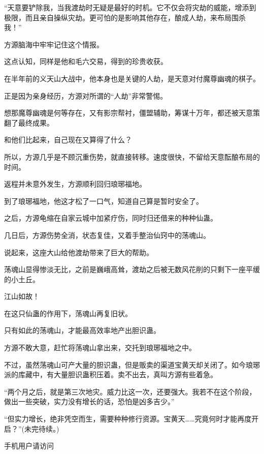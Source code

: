 \begin{this_body}
“天意要铲除我，当我渡劫时无疑是最好的时机。它不仅会将灾劫的威能，增添到极限，而且亲自操纵灾劫。更可怕的是影响其他存在，酿成人劫，来布局围杀我！”

方源脑海中牢牢记住这个情报。

这点认知，同样是他和毛六交易，得到的珍贵收获。

在半年前的义天山大战中，他本身也是关键的人劫，是天意对付魔尊幽魂的棋子。

正是因为亲身经历，方源对所谓的“人劫”非常警惕。

想那魔尊幽魂是何等存在，又有影宗帮衬，僵盟辅助，筹谋十万年，都还被天意策翻了最终成果。

和他们比起来，自己现在又算得了什么？

所以，方源几乎是不顾沉重伤势，就直接转移。速度很快，不留给天意酝酿布局的时间。

返程并未意外发生，方源顺利回归琅琊福地。

到了琅琊福地，他这才松了一口气，知道自己算是暂时安全了。

之后，方源龟缩在自家云城中加紧疗伤，同时归还借来的种种仙蛊。

几日后，方源伤势全消，状态复佳，又着手整治仙窍中的荡魂山。

说起来，这座大山给他渡劫带来了巨大的帮助。

荡魂山显得惨淡无比，之前是巍峨高耸，渡劫之后被无数风花削的只剩下一座平缓的小土丘。

江山如故！

在这只仙蛊的作用下，荡魂山再复旧状。

只有如此的荡魂山，才能最高效率地产出胆识蛊。

方源不敢大意，赶忙将荡魂山拿出来，交托到琅琊福地之中。

不过，虽然荡魂山可产大量的胆识蛊，但是贩卖的渠道宝黄天却关闭了。如今琅琊派的库藏中，有大量胆识蛊积压着。卖不出去，真叫方源有些着急。

“两个月之后，就是第三次地灾。威力比这一次，还要强大。我若不在这个阶段，做出一些突破，实力没有增长的话，恐怕是凶多吉少。”

“但实力增长，绝非凭空而生，需要种种修行资源。宝黄天……究竟何时才能再度开启？”(未完待续。)

手机用户请访问

\end{this_body}

